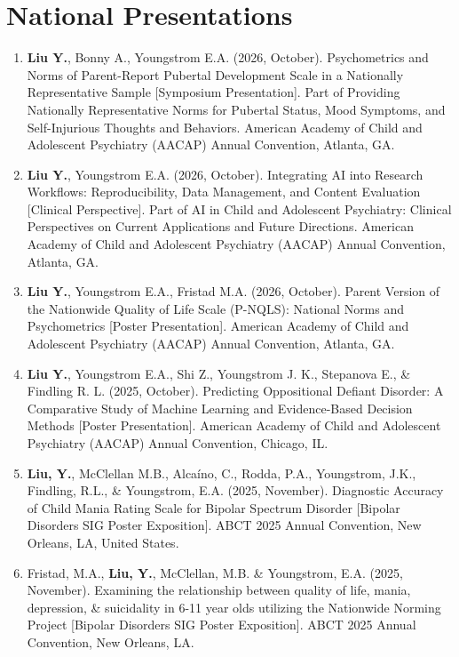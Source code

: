 \documentclass[12pt]{article}
\begin{document}
\section{National Presentations}
\begin{enumerate}
    \item \textbf{Liu Y.}, Bonny A., Youngstrom E.A. (2026, October). Psychometrics and Norms of Parent-Report Pubertal Development Scale in a Nationally Representative Sample [Symposium Presentation]. Part of Providing Nationally Representative Norms for Pubertal Status, Mood Symptoms, and Self-Injurious Thoughts and Behaviors. American Academy of Child and Adolescent Psychiatry (AACAP) Annual Convention, Atlanta, GA.

    \item \textbf{Liu Y.}, Youngstrom E.A. (2026, October). Integrating AI into Research Workflows: Reproducibility, Data Management, and Content Evaluation [Clinical Perspective]. Part of AI in Child and Adolescent Psychiatry: Clinical Perspectives on Current Applications and Future Directions. American Academy of Child and Adolescent Psychiatry (AACAP) Annual Convention, Atlanta, GA.

    \item \textbf{Liu Y.}, Youngstrom E.A., Fristad M.A. (2026, October). Parent Version of the Nationwide Quality of Life Scale (P-NQLS): National Norms and Psychometrics [Poster Presentation]. American Academy of Child and Adolescent Psychiatry (AACAP) Annual Convention, Atlanta, GA.
    
    \item \textbf{Liu Y.}, Youngstrom E.A., Shi Z., Youngstrom J. K., Stepanova E., \& Findling R. L. (2025, October). Predicting Oppositional Defiant Disorder: A Comparative Study of Machine Learning and Evidence-Based Decision Methods [Poster Presentation]. American Academy of Child and Adolescent Psychiatry (AACAP) Annual Convention, Chicago, IL.

    \item \textbf{Liu, Y.}, McClellan M.B., Alcaíno, C., Rodda, P.A., Youngstrom, J.K., Findling, R.L., \& Youngstrom, E.A. (2025, November). Diagnostic Accuracy of Child Mania Rating Scale for Bipolar Spectrum Disorder [Bipolar Disorders SIG Poster Exposition]. ABCT 2025 Annual Convention, New Orleans, LA, United States.

    \item Fristad, M.A., \textbf{Liu, Y.}, McClellan, M.B. \& Youngstrom, E.A. (2025, November). Examining the relationship between quality of life, mania, depression, \& suicidality in 6-11 year olds utilizing the Nationwide Norming Project [Bipolar Disorders SIG Poster Exposition]. ABCT 2025 Annual Convention, New Orleans, LA.


\end{enumerate}
\end{document}
